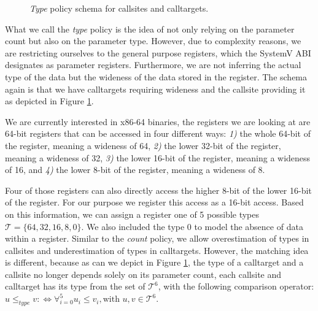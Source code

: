 \begin{figure}[!h]
{
}

\caption{\emph{Type} policy schema for callsites and calltargets.}
\label{fig:TYPEschema}
\end{figure}
What we call the \emph{type} policy is the idea of not only relying on the parameter count but also on the parameter type. However, due to complexity reasons,
we are restricting ourselves to the general purpose registers, which the SystemV ABI designates as parameter registers. Furthermore, we are not inferring 
the actual type of the data but the wideness of the data stored in the register. The schema again is that we have calltargets requiring wideness and the
callsite providing it as depicted in Figure \ref{fig:TYPEschema}.

We are currently interested in x86-64 binaries, the registers we are looking at are 64-bit registers that can be accessed in four different ways:
\textit{1)} the whole 64-bit of the register, meaning a wideness of 64,
\textit{2)} the lower 32-bit of the register, meaning a wideness of 32,
\textit{3)} the lower 16-bit of the register, meaning a wideness of 16, and
\textit{4)} the lower 8-bit of the register, meaning a wideness of 8.

Four of those registers can also directly access the higher 8-bit of the lower 16-bit of the register. For our purpose we register this access as a 16-bit access. 
Based on this information,
we can assign a register one of 5 possible types $\mathcal{T} = \{64, 32, 16, 8, 0\}$. We also included the type 0 to model the absence of data within a register. 
Similar to the \emph{count} policy, we allow overestimation of types in callsites and underestimation of types in calltargets. However, the matching idea is different, 
because as can we depict in Figure \ref{fig:TYPEschema}, the type of a calltarget and a callsite no longer depends solely on its parameter count, 
each callsite and calltarget has its type from the set of $\mathcal{T}^6$, with the following comparison operator:
$
	u \leq_{type} v :\Longleftrightarrow  
	\forall_{i = 0}^{5} {u_i \leq v_i} , \text {with } u, v \in \mathcal{T}^6
$.

